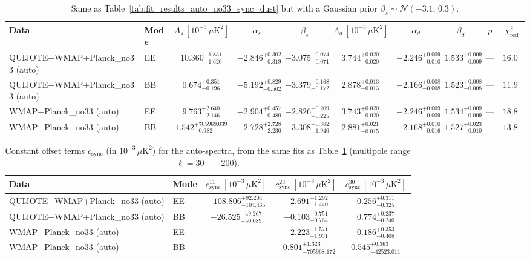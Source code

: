\begin{table}[h]
\centering
\scriptsize
\setlength{\tabcolsep}{4pt}
\caption{Same as Table~\ref{tab:fit_results_auto_no33_sync_dust} but with a Gaussian prior $\beta_s \sim \mathcal{N}(-3.1,\,0.3)$.}
\label{tab:fit_results_auto_no33_sync_dust_prior_betas}
\begin{tabular}{llcccccccc}
\toprule
Data & Mode & $A_s\,[10^{-3}\,\mu\mathrm{K}^2]$ & $\alpha_s$ & $\beta_s$ & $A_d\,[10^{-3}\,\mu\mathrm{K}^2]$ & $\alpha_d$ & $\beta_d$ & $\rho$ & $\chi^2_\mathrm{red}$ \\
\midrule
QUIJOTE+WMAP+Planck\_no33 (auto) & EE & $10.360^{+1.831}_{-1.620}$ & $-2.846^{+0.302}_{-0.319}$ & $-3.075^{+0.074}_{-0.071}$ & $3.744^{+0.020}_{-0.020}$ & $-2.246^{+0.009}_{-0.010}$ & $1.533^{+0.009}_{-0.009}$ & --- & $16.09$ \\
QUIJOTE+WMAP+Planck\_no33 (auto) & BB & $0.674^{+0.351}_{-0.196}$ & $-5.192^{+0.829}_{-0.562}$ & $-3.379^{+0.168}_{-0.172}$ & $2.878^{+0.013}_{-0.013}$ & $-2.166^{+0.008}_{-0.008}$ & $1.523^{+0.008}_{-0.008}$ & --- & $11.99$ \\
WMAP+Planck\_no33 (auto) & EE & $9.763^{+2.640}_{-2.146}$ & $-2.904^{+0.457}_{-0.480}$ & $-2.826^{+0.209}_{-0.225}$ & $3.743^{+0.020}_{-0.020}$ & $-2.246^{+0.009}_{-0.009}$ & $1.534^{+0.009}_{-0.009}$ & --- & $18.83$ \\
WMAP+Planck\_no33 (auto) & BB & $1.542^{+705969.039}_{-0.982}$ & $-2.728^{+2.728}_{-2.230}$ & $-3.308^{+0.382}_{-1.946}$ & $2.881^{+0.021}_{-0.015}$ & $-2.168^{+0.010}_{-0.016}$ & $1.527^{+0.023}_{-0.010}$ & --- & $13.85$ \\
\bottomrule
\end{tabular}
\end{table}

\begin{table}[h]
\centering
\scriptsize
\setlength{\tabcolsep}{4pt}
\caption{Constant offset terms $c_{\mathrm{sync}}$ (in $10^{-3}\,\mu\mathrm{K}^2$) for the auto-spectra, from the same fits as Table~\ref{tab:fit_results_auto_no33_sync_dust_prior_betas} (multipole range $\ell=30--200$).}
\label{tab:fit_results_auto_no33_sync_dust_prior_betas_c_terms}
\begin{tabular}{llccc}
\toprule
Data & Mode & $c_{\mathrm{sync}}^{11}\,[10^{-3}\,\mu\mathrm{K}^2]$ & $c_{\mathrm{sync}}^{23}\,[10^{-3}\,\mu\mathrm{K}^2]$ & $c_{\mathrm{sync}}^{30}\,[10^{-3}\,\mu\mathrm{K}^2]$ \\
\midrule
QUIJOTE+WMAP+Planck\_no33 (auto) & EE & $-108.806^{+92.204}_{-104.465}$ & $-2.691^{+1.292}_{-1.440}$ & $0.256^{+0.311}_{-0.325}$ \\
QUIJOTE+WMAP+Planck\_no33 (auto) & BB & $-26.525^{+49.267}_{-50.089}$ & $-0.103^{+0.751}_{-0.764}$ & $0.774^{+0.237}_{-0.240}$ \\
WMAP+Planck\_no33 (auto) & EE & --- & $-2.223^{+1.571}_{-1.931}$ & $0.186^{+0.353}_{-0.408}$ \\
WMAP+Planck\_no33 (auto) & BB & --- & $-0.801^{+1.323}_{-705968.172}$ & $0.545^{+0.363}_{-42523.011}$ \\
\bottomrule
\end{tabular}
\end{table}
